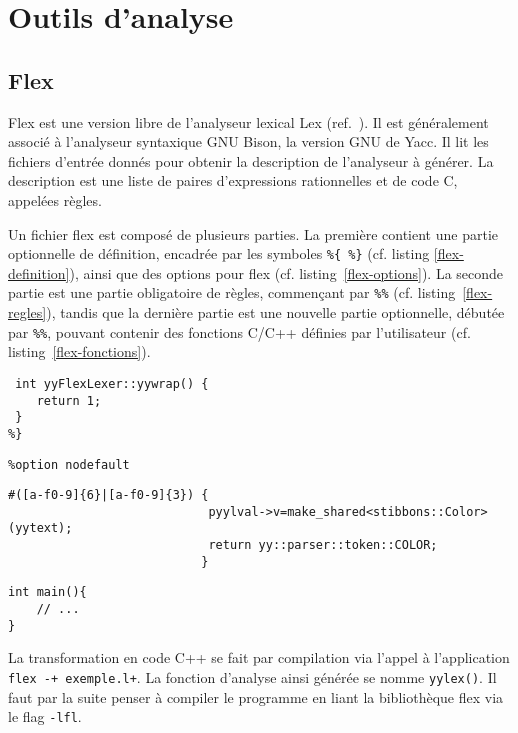 \section{Outils d'analyse}

\subsection{Flex}
\label{Flex}

Flex est une version libre de l'analyseur lexical Lex (ref.~\cite{flex}). Il est généralement associé à l'analyseur syntaxique GNU Bison, la version GNU de Yacc.
Il lit les fichiers d'entrée donnés pour obtenir la description de l'analyseur à générer. La description est une liste de paires d'expressions rationnelles et de code C, appelées règles.

Un fichier flex est composé de plusieurs parties. La première contient une partie optionnelle de définition, encadrée par les symboles \verb|%{ %}| (cf. listing \ref{flex-definition}), ainsi que des options pour flex (cf. listing~\ref{flex-options}). La seconde partie est une partie obligatoire de règles, commençant par \verb|%%| (cf. listing~\ref{flex-regles}), tandis que la dernière partie est une nouvelle partie optionnelle, débutée par \verb|%%|, pouvant contenir des fonctions C/C++ définies par l'utilisateur (cf. listing~\ref{flex-fonctions}).

\begin{lstlisting}[caption=Partie définition d'un fichier flex,label=flex-definition]
%{
 int yyFlexLexer::yywrap() {
	return 1;
 }
%}
\end{lstlisting}

\begin{lstlisting}[caption=Options flex,label=flex-options]
%option c++
%option nodefault
\end{lstlisting}

\begin{lstlisting}[label=flex-regles,caption=Partie règles de flex]
%%
#([a-f0-9]{6}|[a-f0-9]{3}) {
							pyylval->v=make_shared<stibbons::Color>(yytext);
							return yy::parser::token::COLOR;
						   }
\end{lstlisting}
\begin{lstlisting}[label=flex-fonctions,caption=Partie fonctions de flex]
%%
int main(){
	// ...
}
\end{lstlisting}

La transformation en code C++ se fait par compilation via l'appel à l'application \verb|flex -+ exemple.l+|. La fonction d'analyse ainsi générée se nomme \verb|yylex()|.
Il faut par la suite penser à compiler le programme en liant la bibliothèque flex via le flag \verb|-lfl|.

